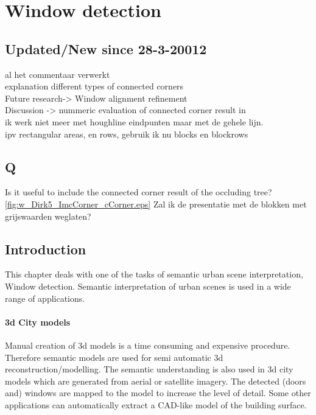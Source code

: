 







\section{Window detection}
\subsection{Updated/New since 28-3-20012}
al het commentaar verwerkt\\
explanation different types of connected corners\\
Future research-> Window alignment refinement\\
Discussion -> nummeric evaluation of connected corner result in \\
ik werk niet meer met houghline eindpunten maar met de gehele lijn.\\
ipv rectangular areas, en rows, gebruik ik nu blocks en blockrows\\

\subsection{Q}
Is it useful to include the connected corner result of the occluding tree?
\ref{fig:w_Dirk5_ImcCorner_cCorner.eps}
Zal ik de presentatie met de blokken met grijswaarden weglaten?

\label{chap:windowDetection}
\subsection{Introduction}
This chapter deals with one of the tasks of semantic urban scene interpretation, Window detection. 
Semantic interpretation of urban scenes is used in a wide range of applications.

\paragraph{3d City models} 
	Manual creation of 3d models is a time consuming and expensive procedure.
	Therefore semantic models are used for semi automatic 3d
	reconstruction/modelling.
	The semantic understanding is also used in 3d city models which are
	generated from aerial or satellite imagery.  The detected (doors and)
	windows are mapped to the model to increase the level of detail. 
	Some other applications can automatically extract a CAD-like model of
	the building surface.

